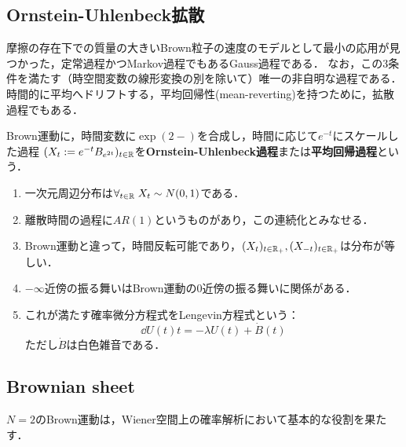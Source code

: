 \documentclass[uplatex,dvipdfmx]{jsreport}
\begin{document}
\subsection{Ornstein-Uhlenbeck拡散}

\begin{tcolorbox}[colframe=ForestGreen, colback=ForestGreen!10!white,breakable,colbacktitle=ForestGreen!40!white,coltitle=black,fonttitle=\bfseries\sffamily,
title=]
    摩擦の存在下での質量の大きいBrown粒子の速度のモデルとして最小の応用が見つかった，定常過程かつMarkov過程でもあるGauss過程である．
    なお，この3条件を満たす（時空間変数の線形変換の別を除いて）唯一の非自明な過程である．
    時間的に平均へドリフトする，平均回帰性(mean-reverting)を持つために，拡散過程でもある．
\end{tcolorbox}

\begin{definition}
    Brown運動に，時間変数に$\exp(2-)$を合成し，時間に応じて$e^{-t}$にスケールした過程
    $(X_t:=e^{-t}B_{e^{2t}})_{t\in\mathbb{R}}$を\textbf{Ornstein-Uhlenbeck過程}または\textbf{平均回帰過程}という．
\end{definition}
\begin{remarks}\mbox{}
    \begin{enumerate}
        \item 一次元周辺分布は$\forall_{t\in\mathbb{R}}\;X_t\sim N(0,1)$である．
        \item 離散時間の過程に$AR(1)$というものがあり，この連続化とみなせる．
        \item Brown運動と違って，時間反転可能であり，$(X_t)_{t\in\mathbb{R}_+},(X_{-t})_{t\in\mathbb{R}_+}$は分布が等しい．
        \item $-\infty$近傍の振る舞いはBrown運動の$0$近傍の振る舞いに関係がある．
        \item これが満たす確率微分方程式をLengevin方程式という：
        \[\dd{U(t)}{t}=-\lambda U(t)+\dot{B}(t)\]
        ただし$\dot{B}$は白色雑音である．
    \end{enumerate}
\end{remarks}



\subsection{Brownian sheet}

\begin{tcolorbox}[colframe=ForestGreen, colback=ForestGreen!10!white,breakable,colbacktitle=ForestGreen!40!white,coltitle=black,fonttitle=\bfseries\sffamily,
title=]
    $N=2$のBrown運動は，Wiener空間上の確率解析において基本的な役割を果たす．
\end{tcolorbox}
\end{document}
